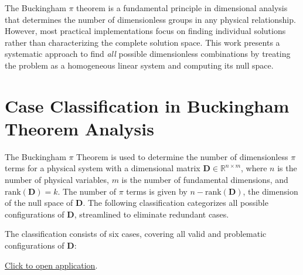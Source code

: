 \begin{remarkbox}
\begin{remarkT}
The Buckingham $\pi$ theorem is a fundamental principle in dimensional analysis that determines the number of dimensionless groups in any physical relationship. However, most practical implementations focus on finding individual solutions rather than characterizing the complete solution space. This work presents a systematic approach to find \emph{all} possible dimensionless combinations by treating the problem as a homogeneous linear system and computing its null space.
\end{remarkT}
\end{remarkbox}

\section{Case Classification in Buckingham Theorem Analysis}
\label{sec:buckinghamcases}

The Buckingham $\pi$ Theorem is used to determine the number of dimensionless $\pi$ terms for a physical system with a dimensional matrix $\mathbf{D} \in \mathbb{R}^{n \times m}$, where $n$ is the number of physical variables, $m$ is the number of fundamental dimensions, and $\text{rank}(\mathbf{D}) = k$. The number of $\pi$ terms is given by $n - \text{rank}(\mathbf{D})$, the dimension of the null space of $\mathbf{D}$. The following classification categorizes all possible configurations of $\mathbf{D}$, streamlined to eliminate redundant cases.

The classification consists of six cases, covering all valid and problematic configurations of $\mathbf{D}$:

\href{https://enriquecastilloron.github.io/mi-libro-interactivo/apps/PRUEBAObtainPiTerms_Flexible_LinearBUENO9a.html}{\underline{Click to open application}}.



